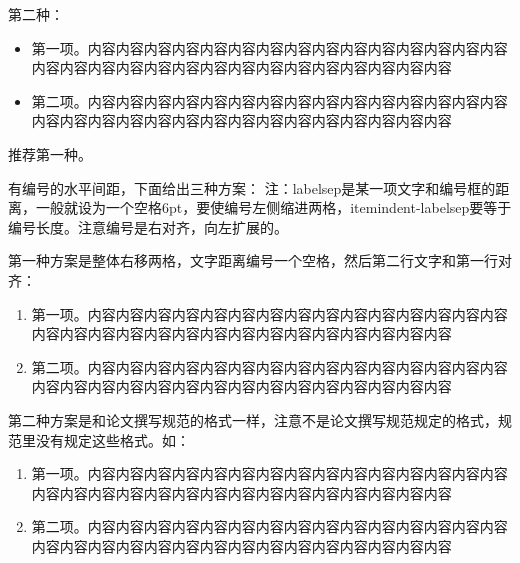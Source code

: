 第二种：
\begin{itemize}[topsep = 0 pt, itemsep= 0 pt, parsep=0pt, partopsep=0pt, leftmargin=0pt, itemindent=36pt, labelsep=6pt, listparindent=24pt]
	\item 第一项。内容内容内容内容内容内容内容内容内容内容内容内容内容内容内容内容内容内容内容内容内容内容内容内容内容内容内容内容内容内容

	\item 第二项。内容内容内容内容内容内容内容内容内容内容内容内容内容内容内容内容内容内容内容内容内容内容内容内容内容内容内容内容内容内容
	
\end{itemize}

推荐第一种。

有编号的水平间距，下面给出三种方案：
注：labelsep是某一项文字和编号框的距离，一般就设为一个空格6pt，要使编号左侧缩进两格，itemindent-labelsep要等于编号长度。注意编号是右对齐，向左扩展的。

第一种方案是整体右移两格，文字距离编号一个空格，然后第二行文字和第一行对齐：
\begin{enumerate}[topsep = 0 pt, itemsep= 0 pt, parsep=0pt, partopsep=0pt, leftmargin=44pt, itemindent=0pt, labelsep=6pt, label=(\arabic*)]
	\item 第一项。内容内容内容内容内容内容内容内容内容内容内容内容内容内容内容内容内容内容内容内容内容内容内容内容内容内容内容内容内容内容

	\item 第二项。内容内容内容内容内容内容内容内容内容内容内容内容内容内容内容内容内容内容内容内容内容内容内容内容内容内容内容内容内容内容
	
\end{enumerate}

第二种方案是和论文撰写规范的格式一样，注意不是论文撰写规范规定的格式，规范里没有规定这些格式。如：
\begin{enumerate}[topsep = 0 pt, itemsep= 0 pt, parsep=0pt, partopsep=0pt, leftmargin=0pt, itemindent=44pt, labelsep=6pt, listparindent=24pt, label=(\arabic*)]
	\item 第一项。内容内容内容内容内容内容内容内容内容内容内容内容内容内容内容内容内容内容内容内容内容内容内容内容内容内容内容内容内容内容

	\item 第二项。内容内容内容内容内容内容内容内容内容内容内容内容内容内容内容内容内容内容内容内容内容内容内容内容内容内容内容内容内容内容
	
\end{enumerate}

